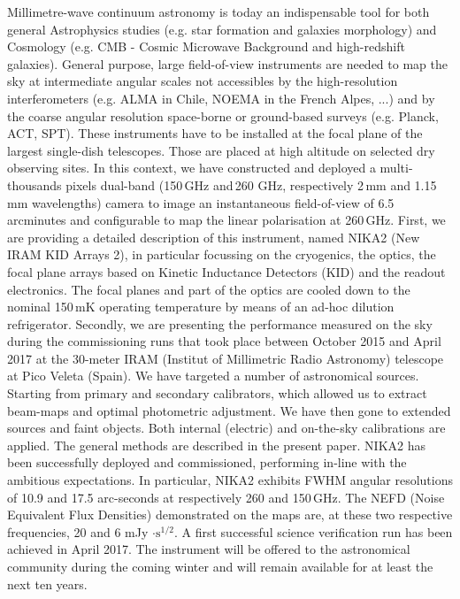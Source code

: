 \documentclass[]{aa} %
\begin{document}
  \abstract
   {Millimetre-wave continuum astronomy is today an indispensable tool for both general Astrophysics studies (e.g. star formation and galaxies morphology) and Cosmology (e.g. CMB - Cosmic Microwave Background and high-redshift galaxies). General purpose, large field-of-view instruments are needed to map the sky at intermediate angular scales not accessibles by the high-resolution interferometers (e.g. ALMA in Chile, NOEMA in the French Alpes, ...) and by the coarse angular resolution space-borne or ground-based surveys (e.g. Planck, ACT, SPT). These instruments have to be installed at the focal plane of the largest single-dish telescopes. Those are placed at high altitude on selected dry observing sites. In this context, we have constructed and deployed a multi-thousands pixels dual-band (150\,GHz and\,260 GHz, respectively 2\,mm and 1.15\,mm wavelengths) camera to image an instantaneous field-of-view of 6.5\,arcminutes and configurable to map the linear polarisation at 260\,GHz.}
   {First, we are providing a detailed description of this instrument, named NIKA2 (New IRAM KID Arrays 2), in particular focussing on the cryogenics, the optics, the focal plane arrays based on Kinetic Inductance Detectors (KID) and the readout electronics. The focal planes and part of the optics are cooled down to the nominal 150\,mK operating temperature by means of an ad-hoc dilution refrigerator. 
Secondly, we are presenting the performance measured on the sky during the commissioning runs that took place between October 2015 and April 2017 at the 30-meter IRAM (Institut of Millimetric Radio Astronomy) telescope at Pico Veleta (Spain).}
   {We have targeted a number of astronomical sources. Starting from primary and secondary calibrators, which allowed us to extract beam-maps and optimal photometric adjustment. We have then gone to extended sources and faint objects. Both internal (electric) and on-the-sky calibrations are applied. The general methods are described in the present paper.}
   {NIKA2 has been successfully deployed and commissioned, performing in-line with the ambitious expectations. In particular, NIKA2 exhibits FWHM angular resolutions of 10.9 and 17.5 arc-seconds at respectively 260 and 150\,GHz. The NEFD (Noise Equivalent Flux Densities) demonstrated on the maps are, at these two respective frequencies, 20 and 6 mJy $\cdot\textrm{s}^{1/2}$. A first successful science verification run has been achieved in April 2017. The instrument will be offered to the astronomical community during the coming winter and will remain available for at least the next ten years.}
  {}
\end{document}
